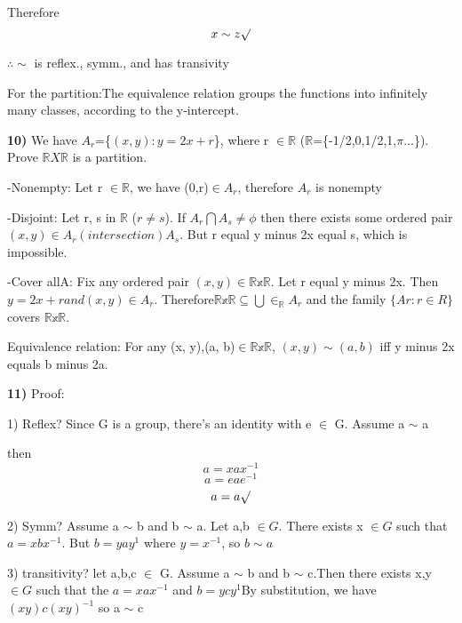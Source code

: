 \documentclass{article}
\begin{document}
Therefore $$x  \sim z\surd$$

\begin{center}
$\therefore \sim$ is reflex., symm., and has transivity 
\end{center}

For the partition:The equivalence relation groups the functions into infinitely many classes, according to the y-intercept. 


\newpage

\textbf{10)}  We have $A_{r}$=\{$(x,y) : y=2x+r$\}, where r $\in \mathbb{R}$ ($\mathbb{R}$=\{-1/2,0,1/2,1,$\pi$...\}).
 Prove $\mathbb{R}X\mathbb{R}$ is a partition. 

\medskip

-Nonempty: Let r $\in \mathbb{R}$, we have (0,r)$\in A_{r}$, therefore $A_{r}$ is nonempty

\medskip


-Disjoint: Let r, s  in $\mathbb{R}$ ($r \neq s$). If $A_{r} \bigcap A_{s} \neq \phi$ then there exists some ordered pair
$(x, y) \in A_{r}  (intersection)  A_{s}$. But  r equal y minus 2x equal s, which is impossible.

\medskip

-Cover allA:  Fix any ordered pair $(x, y) \in \mathbb{R\text{x}R}$. Let r equal y minus 2x. Then $y = 2x+r and (x, y) \in A_{r}$.
Therefore$\mathbb{R\text{x}R} \subseteq \bigcup \in _\mathbb{R}A_{r}$ and the family $\{Ar : r \in R\}$ covers $\mathbb{R\text{x}R}$.

\medskip

Equivalence relation: For any (x, y),(a, b)$ \in \mathbb{R\text{x}R}$,
$(x, y) \sim (a, b)$ iff y minus 2x equals  b minus 2a.

\newpage

\textbf{11)} Proof:

\medskip

1) Reflex? Since G is a group, there's an identity with e $\in$ G. Assume a $\sim$ a

\medskip

then $$a=xax^{-1}$$
$$a=eae^{-1}$$
$$a=a \surd$$

2) Symm? Assume a $\sim$ b and b $\sim$ a. Let a,b $\in G$. There exists x $\in G$ such that $a=xbx^{-1}$. But $b=yay^{1}$ where $y=x^{-1}$, so $b\sim a$


\medskip
\medskip


3) transitivity? let a,b,c $\in$ G. Assume a $\sim$ b and b $\sim$ c.Then there exists x,y $\in G$ such that the $a=xax^{-1}$ and $b=ycy^{1}$By substitution, we have $(xy)c(xy)^{-1}$ so a $\sim$ c
\end{document}

